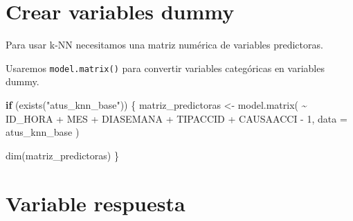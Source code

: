 \documentclass[
  11pt,
  letterpaper,
]{book}
\newenvironment{Shaded}{\begin{snugshade}}{\end{snugshade}}
\newcommand{\AttributeTok}[1]{\textcolor[rgb]{0.40,0.45,0.13}{#1}}
\newcommand{\ControlFlowTok}[1]{\textcolor[rgb]{0.00,0.23,0.31}{\textbf{#1}}}
\newcommand{\DecValTok}[1]{\textcolor[rgb]{0.68,0.00,0.00}{#1}}
\newcommand{\FunctionTok}[1]{\textcolor[rgb]{0.28,0.35,0.67}{#1}}
\newcommand{\NormalTok}[1]{\textcolor[rgb]{0.00,0.23,0.31}{#1}}
\newcommand{\OtherTok}[1]{\textcolor[rgb]{0.00,0.23,0.31}{#1}}
\newcommand{\SpecialCharTok}[1]{\textcolor[rgb]{0.37,0.37,0.37}{#1}}
\newcommand{\StringTok}[1]{\textcolor[rgb]{0.13,0.47,0.30}{#1}}
\begin{document}
\begin{Shaded}
\end{Shaded}

\begin{Shaded}
\end{Shaded}

\section{Crear variables dummy}\label{crear-variables-dummy}

Para usar k-NN necesitamos una matriz numérica de variables predictoras.

Usaremos \texttt{model.matrix()} para convertir variables categóricas en
variables dummy.

\begin{Shaded}
\begin{Highlighting}[]
\ControlFlowTok{if}\NormalTok{ (}\FunctionTok{exists}\NormalTok{(}\StringTok{"atus\_knn\_base"}\NormalTok{)) \{}
\NormalTok{  matriz\_predictoras }\OtherTok{\textless{}{-}} \FunctionTok{model.matrix}\NormalTok{(}
    \SpecialCharTok{\textasciitilde{}}\NormalTok{ ID\_HORA }\SpecialCharTok{+}\NormalTok{ MES }\SpecialCharTok{+}\NormalTok{ DIASEMANA }\SpecialCharTok{+}\NormalTok{ TIPACCID }\SpecialCharTok{+}\NormalTok{ CAUSAACCI }\SpecialCharTok{{-}} \DecValTok{1}\NormalTok{,}
    \AttributeTok{data =}\NormalTok{ atus\_knn\_base}
\NormalTok{  )}

  \FunctionTok{dim}\NormalTok{(matriz\_predictoras)}
\NormalTok{\}}
\end{Highlighting}
\end{Shaded}

\section{Variable respuesta}\label{variable-respuesta-1}
\end{document}
